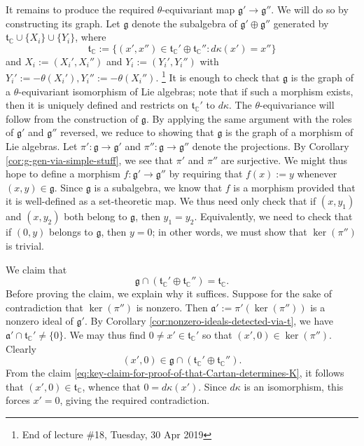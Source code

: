 \documentclass[reqno]{amsart} 
\begin{document}
It remains to produce the required $\theta$-equivariant map $\mathfrak{g} ' \rightarrow \mathfrak{g} ''$.  We will do so by constructing its graph.  Let $\mathfrak{g}$ denote the subalgebra of $\mathfrak{g} ' \oplus \mathfrak{g} ''$ generated by $\mathfrak{t}_{\mathbb{C}} \cup \{X_i\} \cup \{Y_i\}$, where
\begin{equation*}
  \mathfrak{t}_{\mathbb{C}} := \{(x', x'' ) \in \mathfrak{t}_{\mathbb{C}} ' \oplus \mathfrak{t}_{\mathbb{C}} '' : d \kappa(x') = x'' \}
\end{equation*}
and $X_i := (X_i', X_i'')$ and $Y_i := (Y_i', Y_i'')$ with $Y_i' := -\theta(X_i'), Y_i'' := -\theta(X_i'')$.  \footnote{End of lecture \#18, Tuesday, 30 Apr 2019} It is enough to check that $\mathfrak{g}$ is the graph of a $\theta$-equivariant isomorphism of Lie algebras; note that if such a morphism exists, then it is uniquely defined and restricts on $\mathfrak{t}_{\mathbb{C} }'$ to $d \kappa$.  The $\theta$-equivariance will follow from the construction of $\mathfrak{g}$.  By applying the same argument with the roles of $\mathfrak{g} '$ and $\mathfrak{g} ''$ reversed, we reduce to showing that $\mathfrak{g}$ is the graph of a morphism of Lie algebras.  Let $\pi ' : \mathfrak{g} \rightarrow \mathfrak{g} '$ and $\pi '' : \mathfrak{g} \rightarrow \mathfrak{g} ''$ denote the projections.  By Corollary \ref{cor:g-gen-via-simple-stuff}, we see that $\pi '$ and $\pi ''$ are surjective.  We might thus hope to define a morphism $f : \mathfrak{g} ' \rightarrow \mathfrak{g} ''$ by requiring that $f(x) := y$ whenever $(x,y) \in \mathfrak{g}$.  Since $\mathfrak{g}$ is a subalgebra, we know that $f$ is a morphism provided that it is well-defined as a set-theoretic map.  We thus need only check that if $(x,y_1)$ and $(x,y_2)$ both belong to $\mathfrak{g}$, then $y_1 = y_2$.  Equivalently, we need to check that if $(0,y)$ belongs to $\mathfrak{g}$, then $y = 0$; in other words, we must show that $\ker(\pi '')$ is trivial.

We claim that
\begin{equation}\label{eq:key-claim-for-proof-of-that-Cartan-determines-K}
  \mathfrak{g} \cap (\mathfrak{t}_{\mathbb{C}}' \oplus
  \mathfrak{t}_{\mathbb{C} }'')
  =
  \mathfrak{t}_{\mathbb{C}}.
\end{equation}
Before proving the claim, we explain why it suffices.  Suppose for the sake of contradiction that $\ker(\pi '')$ is nonzero.  Then $\mathfrak{a} ' := \pi '(\ker(\pi ''))$ is a nonzero ideal of $\mathfrak{g}'$.  By Corollary \ref{cor:nonzero-ideals-detected-via-t}, we have $\mathfrak{a} ' \cap \mathfrak{t}_{\mathbb{C}}' \neq \{0\}$.  We may thus find $0 \neq x' \in \mathfrak{t}_{\mathbb{C} }'$ so that $(x', 0) \in \ker(\pi '')$.  Clearly
\begin{equation*}
  (x',0) \in \mathfrak{g} \cap (\mathfrak{t}_{\mathbb{C}}' \oplus
  \mathfrak{t}_{\mathbb{C} }'').
\end{equation*}
From the claim \eqref{eq:key-claim-for-proof-of-that-Cartan-determines-K}, it follows that $(x', 0) \in \mathfrak{t}_{\mathbb{C}}$, whence that $0 = d \kappa(x')$.  Since $d \kappa$ is an isomorphism, this forces $x' = 0$, giving the required contradiction.
\end{document}
